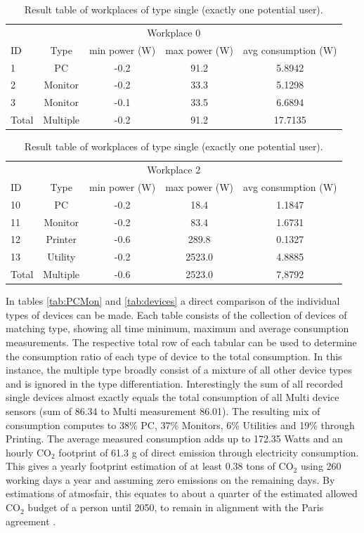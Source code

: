\begin{table}[h]
	\begin{tabular}{l|c|c|c|c}
		\multicolumn{5}{c}{Workplace 0} \\
		ID & Type & min power (W)& max power (W)& avg consumption (W)\\
		1 & PC & -0.2 & 91.2 & 5.8942 \\
		2 & Monitor & -0.2 & 33.3 & 5.1298 \\
		3 & Monitor & -0.1 & 33.5 & 6.6894 \\
		\hline
		Total & Multiple & -0.2 & 91.2 & 17.7135
	\end{tabular}
	\begin{tabular}{l|c|c|c|c}
		\multicolumn{5}{c}{Workplace 2} \\
		ID & Type & min power (W)& max power (W)& avg consumption (W)\\
		10 & PC & -0.2 & 18.4 & 1.1847 \\
		11 & Monitor & -0.2 & 83.4 & 1.6731 \\
		12 & Printer & -0.6 & 289.8 & 0.1327 \\
		13 & Utility & -0.2 & 2523.0 & 4.8885 \\
		\hline 
		Total & Multiple & -0.6 & 2523.0 & 7,8792
	\end{tabular}
	\caption{Result table of workplaces of type single (exactly one potential user).}
	\label{tab:singleworkplace}
\end{table}
In tables \ref{tab:PCMon} and \ref{tab:devices} a direct comparison of the individual types of devices can be made. Each table consists of the collection of devices of matching type, showing all time minimum, maximum and average consumption measurements. The respective total row of each tabular can be used to determine the consumption ratio of each type of device to the total consumption. In this instance, the multiple type broadly consist of a mixture of all other device types and is ignored in the type differentiation. Interestingly the sum of all recorded single devices almost exactly equals the total consumption of all Multi device sensors (sum of 86.34 to Multi measurement 86.01). The resulting mix of consumption computes to 38\% PC, 37\% Monitors, 6\% Utilities and 19\% through Printing. The average measured consumption adds up to 172.35 Watts and an hourly CO$_2$ footprint of 61.3 g of direct emission through electricity consumption. This gives a yearly footprint estimation of at least 0.38 tons of CO$_2$ using 260 working days a year and assuming zero emissions on the remaining days. By estimations of atmosfair, this equates to about a quarter of the estimated allowed CO$_2$ budget of a person until 2050, to remain in alignment with the Paris agreement \cite{co2_capita}. 
